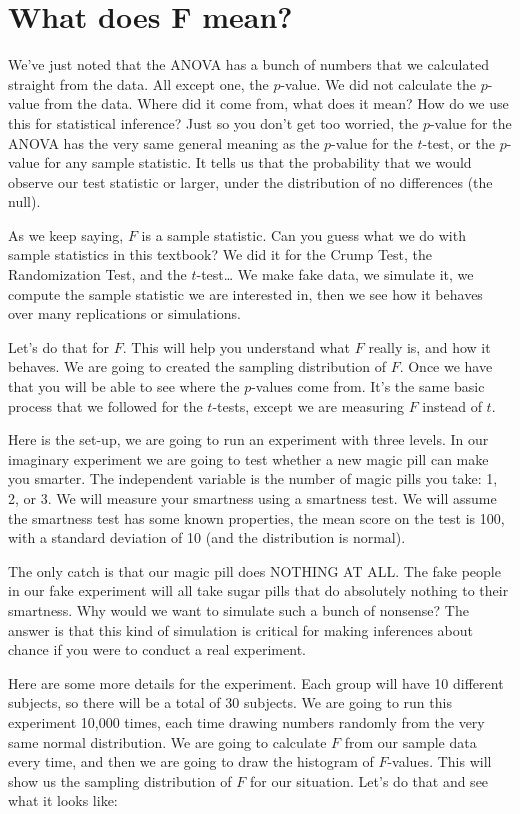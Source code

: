\documentclass[
]{book}
\begin{document}
\section{What does F mean?}\label{what-does-f-mean}

We've just noted that the ANOVA has a bunch of numbers that we calculated straight from the data. All except one, the \(p\)-value. We did not calculate the \(p\)-value from the data. Where did it come from, what does it mean? How do we use this for statistical inference? Just so you don't get too worried, the \(p\)-value for the ANOVA has the very same general meaning as the \(p\)-value for the \(t\)-test, or the \(p\)-value for any sample statistic. It tells us that the probability that we would observe our test statistic or larger, under the distribution of no differences (the null).

As we keep saying, \(F\) is a sample statistic. Can you guess what we do with sample statistics in this textbook? We did it for the Crump Test, the Randomization Test, and the \(t\)-test\ldots{} We make fake data, we simulate it, we compute the sample statistic we are interested in, then we see how it behaves over many replications or simulations.

Let's do that for \(F\). This will help you understand what \(F\) really is, and how it behaves. We are going to created the sampling distribution of \(F\). Once we have that you will be able to see where the \(p\)-values come from. It's the same basic process that we followed for the \(t\)-tests, except we are measuring \(F\) instead of \(t\).

Here is the set-up, we are going to run an experiment with three levels. In our imaginary experiment we are going to test whether a new magic pill can make you smarter. The independent variable is the number of magic pills you take: 1, 2, or 3. We will measure your smartness using a smartness test. We will assume the smartness test has some known properties, the mean score on the test is 100, with a standard deviation of 10 (and the distribution is normal).

The only catch is that our magic pill does NOTHING AT ALL. The fake people in our fake experiment will all take sugar pills that do absolutely nothing to their smartness. Why would we want to simulate such a bunch of nonsense? The answer is that this kind of simulation is critical for making inferences about chance if you were to conduct a real experiment.

Here are some more details for the experiment. Each group will have 10 different subjects, so there will be a total of 30 subjects. We are going to run this experiment 10,000 times, each time drawing numbers randomly from the very same normal distribution. We are going to calculate \(F\) from our sample data every time, and then we are going to draw the histogram of \(F\)-values. This will show us the sampling distribution of \(F\) for our situation. Let's do that and see what it looks like:
\end{document}
